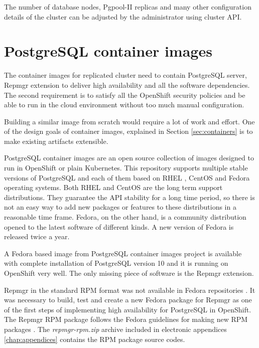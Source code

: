 \documentclass[
  digital, %
  twoside, %
  table,   %
  nolof,   %
  nolot,   %
]{fithesis3}
\begin{document}
The number of database nodes, Pgpool-II replicas and many other configuration details of the cluster can be adjusted by the administrator using cluster API.

\section{PostgreSQL container images} \label{sec:pg_cnt_images}
The container images for replicated cluster need to contain PostgreSQL server, Repmgr extension to deliver high availability and all the software dependencies. The second requirement is to satisfy all the OpenShift security policies and be able to run in the cloud environment without too much manual configuration.

Building a similar image from scratch would require a lot of work and effort. One of the design goals of container images, explained in Section \ref{sec:containers} is to make existing artifacts extensible.

PostgreSQL container images \cite{pg_cnt} are an open source collection of images designed to run in OpenShift or plain Kubernetes. This repository supports multiple stable versions of PostgreSQL and each of them based on RHEL \cite{rhel}, CentOS \cite{centos} and Fedora \cite{getfedora} operating systems.
Both RHEL and CentOS are the long term support distributions. They guarantee the API stability for a long time period, so there is not an easy way to add new packages or features to these distributions in a reasonable time frame. Fedora, on the other hand, is a community distribution opened to the latest software of different kinds. A new version of Fedora is released twice a year.

A Fedora based image from PostgreSQL container images project is available with complete installation of PostgreSQL version 10 and it is running on OpenShift very well. The only missing piece of software is the Repmgr extension.

Repmgr in the standard RPM \cite{rpm} format was not available in Fedora repositories \cite{fedora_repositories}. It was necessary to build, test and create a new Fedora package for Repmgr \cite{fedora_repmgr} as one of the first steps of implementing high availability for PostgreSQL in OpenShift. The Repmgr RPM package follows the Fedora guidelines for making new RPM packages \cite{fedora_new_package}. The \textit{repmgr-rpm.zip} archive included in electronic appendices \ref{chap:appendices} contains the RPM package source codes.
\end{document}
